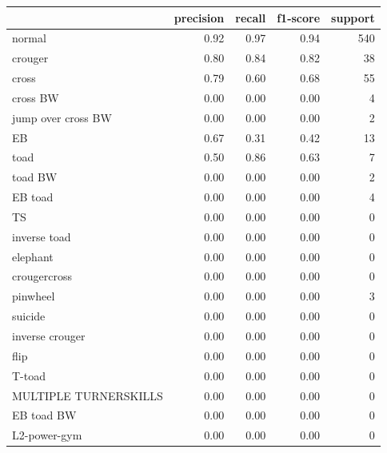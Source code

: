 \begin{table}[h!]
    \begin{tabular}{|l|r|r|r|r|}
                \hline & precision &   recall & f1-score &  support \\ \hline
                normal &       0.92 &     0.97 &     0.94 &      540 \\
               crouger &       0.80 &     0.84 &     0.82 &       38 \\
                 cross &       0.79 &     0.60 &     0.68 &       55 \\
              cross BW &       0.00 &     0.00 &     0.00 &        4 \\
    jump over cross BW &       0.00 &     0.00 &     0.00 &        2 \\
                    EB &       0.67 &     0.31 &     0.42 &       13 \\
                  toad &       0.50 &     0.86 &     0.63 &        7 \\
               toad BW &       0.00 &     0.00 &     0.00 &        2 \\
               EB toad &       0.00 &     0.00 &     0.00 &        4 \\
                    TS &       0.00 &     0.00 &     0.00 &        0 \\
          inverse toad &       0.00 &     0.00 &     0.00 &        0 \\
              elephant &       0.00 &     0.00 &     0.00 &        0 \\
          crougercross &       0.00 &     0.00 &     0.00 &        0 \\
              pinwheel &       0.00 &     0.00 &     0.00 &        3 \\
               suicide &       0.00 &     0.00 &     0.00 &        0 \\
       inverse crouger &       0.00 &     0.00 &     0.00 &        0 \\
                  flip &       0.00 &     0.00 &     0.00 &        0 \\
                T-toad &       0.00 &     0.00 &     0.00 &        0 \\
 MULTIPLE TURNERSKILLS &       0.00 &     0.00 &     0.00 &        0 \\
            EB toad BW &       0.00 &     0.00 &     0.00 &        0 \\
          L2-power-gym &       0.00 &     0.00 &     0.00 &        0 \\

\end{tabular}
\end{table}
